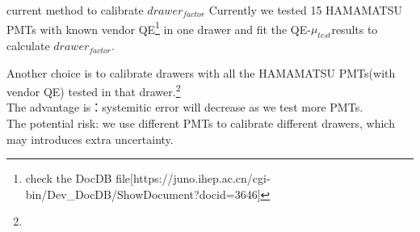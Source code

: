 \documentclass[11pt,compress,xcolor=x11names,UTF8]{beamer}
\begin{document}
\begin{frame}{current method to calibrate $drawer_{factor}$}
Currently we tested 15 HAMAMATSU PMTs with known vendor QE\footnote{check the DocDB file[https://juno.ihep.ac.cn/cgi-bin/Dev\_DocDB/ShowDocument?docid=3646]} in one drawer and fit the QE-$\mu_{test}$results to calculate $drawer_{factor}$.

\vspace{.5cm}

Another choice is {\color{red}to calibrate drawers with all the HAMAMATSU PMTs(with vendor QE) tested in that drawer.}\footnote{}\\
\vspace{.5cm}
The advantage is：systemitic error will decrease as we test more PMTs.\\
The potential risk: we use different PMTs to calibrate different drawers, which may introduces extra uncertainty.

\end{frame}
%
%
\end{document}
